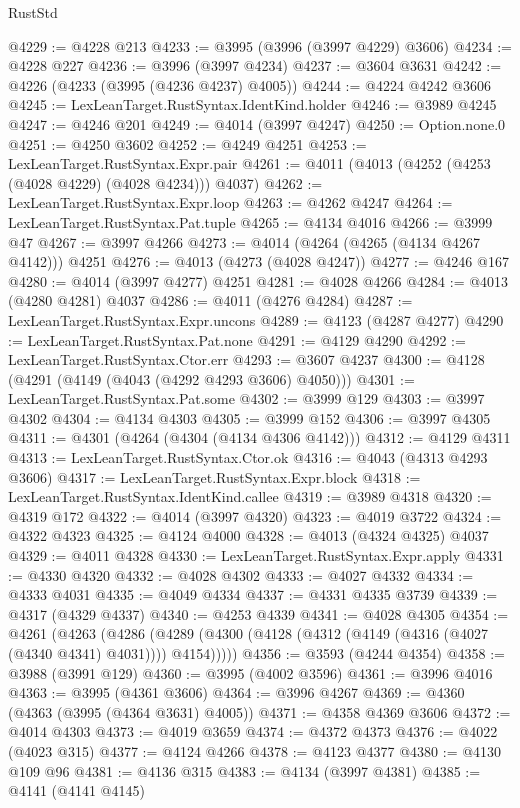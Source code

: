 \begin{lexlean}{RustStd}
\begin{coremodule}
@4229 := @4228 @213
@4233 := @3995 (@3996 (@3997 @4229) @3606)
@4234 := @4228 @227
@4236 := @3996 (@3997 @4234)
@4237 := @3604 @3631
@4242 := @4226 (@4233 (@3995 (@4236 @4237) @4005))
@4244 := @4224 @4242 @3606
@4245 := LexLeanTarget.RustSyntax.IdentKind.holder
@4246 := @3989 @4245
@4247 := @4246 @201
@4249 := @4014 (@3997 @4247)
@4250 := Option.none.{0}
@4251 := @4250 @3602
@4252 := @4249 @4251
@4253 := LexLeanTarget.RustSyntax.Expr.pair
@4261 := @4011 (@4013 (@4252 (@4253 (@4028 @4229) (@4028 @4234))) @4037)
@4262 := LexLeanTarget.RustSyntax.Expr.loop
@4263 := @4262 @4247
@4264 := LexLeanTarget.RustSyntax.Pat.tuple
@4265 := @4134 @4016
@4266 := @3999 @47
@4267 := @3997 @4266
@4273 := @4014 (@4264 (@4265 (@4134 @4267 @4142))) @4251
@4276 := @4013 (@4273 (@4028 @4247))
@4277 := @4246 @167
@4280 := @4014 (@3997 @4277) @4251
@4281 := @4028 @4266
@4284 := @4013 (@4280 @4281) @4037
@4286 := @4011 (@4276 @4284)
@4287 := LexLeanTarget.RustSyntax.Expr.uncons
@4289 := @4123 (@4287 @4277)
@4290 := LexLeanTarget.RustSyntax.Pat.none
@4291 := @4129 @4290
@4292 := LexLeanTarget.RustSyntax.Ctor.err
@4293 := @3607 @4237
@4300 := @4128 (@4291 (@4149 (@4043 (@4292 @4293 @3606) @4050)))
@4301 := LexLeanTarget.RustSyntax.Pat.some
@4302 := @3999 @129
@4303 := @3997 @4302
@4304 := @4134 @4303
@4305 := @3999 @152
@4306 := @3997 @4305
@4311 := @4301 (@4264 (@4304 (@4134 @4306 @4142)))
@4312 := @4129 @4311
@4313 := LexLeanTarget.RustSyntax.Ctor.ok
@4316 := @4043 (@4313 @4293 @3606)
@4317 := LexLeanTarget.RustSyntax.Expr.block
@4318 := LexLeanTarget.RustSyntax.IdentKind.callee
@4319 := @3989 @4318
@4320 := @4319 @172
@4322 := @4014 (@3997 @4320)
@4323 := @4019 @3722
@4324 := @4322 @4323
@4325 := @4124 @4000
@4328 := @4013 (@4324 @4325) @4037
@4329 := @4011 @4328
@4330 := LexLeanTarget.RustSyntax.Expr.apply
@4331 := @4330 @4320
@4332 := @4028 @4302
@4333 := @4027 @4332
@4334 := @4333 @4031
@4335 := @4049 @4334
@4337 := @4331 @4335 @3739
@4339 := @4317 (@4329 @4337)
@4340 := @4253 @4339
@4341 := @4028 @4305
@4354 := @4261
    (@4263
      (@4286 (@4289 (@4300 (@4128 (@4312 (@4149 (@4316 (@4027 (@4340 @4341) @4031)))) @4154)))))
@4356 := @3593 (@4244 @4354)
@4358 := @3988 (@3991 @129)
@4360 := @3995 (@4002 @3596)
@4361 := @3996 @4016
@4363 := @3995 (@4361 @3606)
@4364 := @3996 @4267
@4369 := @4360 (@4363 (@3995 (@4364 @3631) @4005))
@4371 := @4358 @4369 @3606
@4372 := @4014 @4303
@4373 := @4019 @3659
@4374 := @4372 @4373
@4376 := @4022 (@4023 @315)
@4377 := @4124 @4266
@4378 := @4123 @4377
@4380 := @4130 @109 @96
@4381 := @4136 @315
@4383 := @4134 (@3997 @4381)
@4385 := @4141 (@4141 @4145)

\end{coremodule}
\end{lexlean}
